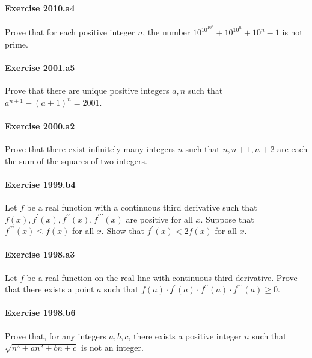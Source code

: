 \documentclass{article}
\begin{document}
\paragraph{Exercise 2010.a4} Prove that for each positive integer $n$, the number $10^{10^{10^n}}+10^{10^n}+10^n-1$ is not prime.


\paragraph{Exercise 2001.a5} Prove that there are unique positive integers $a, n$ such that $a^{n+1}-(a+1)^n=2001$.


\paragraph{Exercise 2000.a2} Prove that there exist infinitely many integers $n$ such that $n, n+1, n+2$ are each the sum of the squares of two integers. 


\paragraph{Exercise 1999.b4} Let $f$ be a real function with a continuous third derivative such that $f(x), f^{\prime}(x), f^{\prime \prime}(x), f^{\prime \prime \prime}(x)$ are positive for all $x$. Suppose that $f^{\prime \prime \prime}(x) \leq f(x)$ for all $x$. Show that $f^{\prime}(x)<2 f(x)$ for all $x$.


\paragraph{Exercise 1998.a3} Let $f$ be a real function on the real line with continuous third derivative. Prove that there exists a point $a$ such that
$f(a) \cdot f^{\prime}(a) \cdot f^{\prime \prime}(a) \cdot f^{\prime \prime \prime}(a) \geq 0$. 


\paragraph{Exercise 1998.b6} Prove that, for any integers $a, b, c$, there exists a positive integer $n$ such that $\sqrt{n^3+a n^2+b n+c}$ is not an integer.
\end{document}
